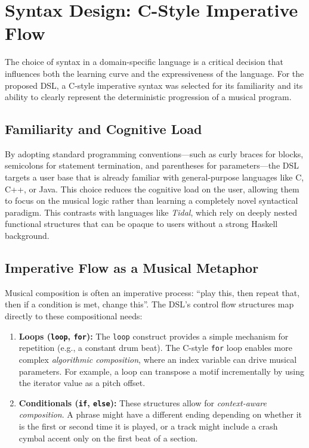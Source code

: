 \section{Syntax Design: C-Style Imperative Flow}\label{sec:syntax-design}

The choice of syntax in a domain-specific language is a critical decision that influences both the learning curve and
the expressiveness of the language.
For the proposed DSL, a C-style imperative syntax was selected for its familiarity and its ability to clearly represent
the deterministic progression of a musical program.

\subsection{Familiarity and Cognitive Load}\label{subsec:familiarity-and-cognitive-load}

By adopting standard programming conventions—such as curly braces for blocks, semicolons for statement termination, and
parentheses for parameters—the DSL targets a user base that is already familiar with general-purpose languages like C,
C++, or Java.
This choice reduces the cognitive load on the user, allowing them to focus on the musical logic rather than learning a
completely novel syntactical paradigm.
This contrasts with languages like \textit{Tidal}, which rely on deeply nested functional structures that can be opaque
to users without a strong Haskell background.

\subsection{Imperative Flow as a Musical Metaphor}\label{subsec:imperative-flow-as-a-musical-metaphor}

Musical composition is often an imperative process: ``play this, then repeat that, then if a condition is met, change
this''.
The DSL's control flow structures map directly to these compositional needs:

\begin{enumerate}
  \item \textbf{Loops (\texttt{loop}, \texttt{for}):} The \texttt{loop} construct provides a simple mechanism for
    repetition (e.g., a constant drum beat).
    The C-style \texttt{for} loop enables more complex \textit{algorithmic composition}, where an index variable can
    drive musical parameters.
    For example, a loop can transpose a motif incrementally by using the iterator value as a pitch offset.
  \item \textbf{Conditionals (\texttt{if}, \texttt{else}):} These structures allow for \textit{context-aware
    composition}.
    A phrase might have a different ending depending on whether it is the first or second time it is played, or a track
    might include a crash cymbal accent only on the first beat of a section.
\end{enumerate}

